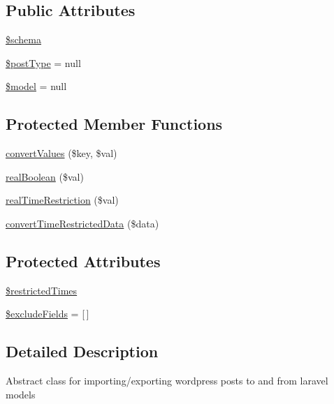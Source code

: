 \subsection*{Public Attributes}
\begin{DoxyCompactItemize}
\item 
\hyperlink{classDMA_1_1Friends_1_1Wordpress_1_1Post_a38fc35f2a6a04046e386cfd3f3564d89}{\$schema}
\item 
\hyperlink{classDMA_1_1Friends_1_1Wordpress_1_1Post_a9b0ea251e8ba6b7161fc51ffa8fb72d8}{\$post\+Type} = null
\item 
\hyperlink{classDMA_1_1Friends_1_1Wordpress_1_1Post_a8a3df2e9db7f90d348d27ea9354176b1}{\$model} = null
\end{DoxyCompactItemize}
\subsection*{Protected Member Functions}
\begin{DoxyCompactItemize}
\item 
\hyperlink{classDMA_1_1Friends_1_1Wordpress_1_1Post_a8969b8476b3ba0afc871532f6f936514}{convert\+Values} (\$key, \$val)
\item 
\hyperlink{classDMA_1_1Friends_1_1Wordpress_1_1Post_a37fb0931dadba67a39a637b336787663}{real\+Boolean} (\$val)
\item 
\hyperlink{classDMA_1_1Friends_1_1Wordpress_1_1Post_a5fbf4b003c2136d8497ddd7d726ad671}{real\+Time\+Restriction} (\$val)
\item 
\hyperlink{classDMA_1_1Friends_1_1Wordpress_1_1Post_a427b14dd99893217929ee8ee93977628}{convert\+Time\+Restricted\+Data} (\$data)
\end{DoxyCompactItemize}
\subsection*{Protected Attributes}
\begin{DoxyCompactItemize}
\item 
\hyperlink{classDMA_1_1Friends_1_1Wordpress_1_1Post_ac0b74792fa83b0a9dafda52eec451e50}{\$restricted\+Times}
\item 
\hyperlink{classDMA_1_1Friends_1_1Wordpress_1_1Post_ac9f76efeb858c94d5ab78e74b4301c16}{\$exclude\+Fields} = \mbox{[}$\,$\mbox{]}
\end{DoxyCompactItemize}


\subsection{Detailed Description}
Abstract class for importing/exporting wordpress posts to and from laravel models 

